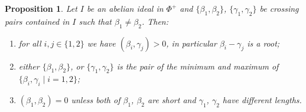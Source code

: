 \documentclass[10pt]{amsart}
\newtheorem{pro}[thm]{Proposition}
\theoremstyle{definition}
\theoremstyle{remark}
\newcommand\be{\beta}
\newcommand\ga{\gamma}
\begin{document}
\begin{pro}\label{pro:vert-comparable}
Let $I$ be an abelian ideal in $\Phi^+$ and $\{\be_1, \be_2\}$,  $\{\ga_1, \ga_2\}$ be crossing pairs contained in $I$ such that $\be_1\ne \be_2$.
Then:
\begin{enumerate}
\item
for all $i,j\in \{1, 2\}$ we have $(\be_i, \ga_j)> 0$, in particular $\be_i-\ga_j$ is a root; 
\label{itm:edges-are-roots}
\item 
either $\{\be_1, \be_2\}$, or $\{\ga_1, \ga_2\}$ is the pair of the minimum and maximum of $\{\be_i, \ga_i\mid i=1,2\}$;
\label{itm:ordine}
\item 
$(\be_1, \be_2)=0$ unless both of $\be_1$, $\be_2$ are short and $\ga_1$, $\ga_2$ have different lengths.
\label{itm:opposti-ortogonali}
\end{enumerate}
\end{pro}
\end{document}
